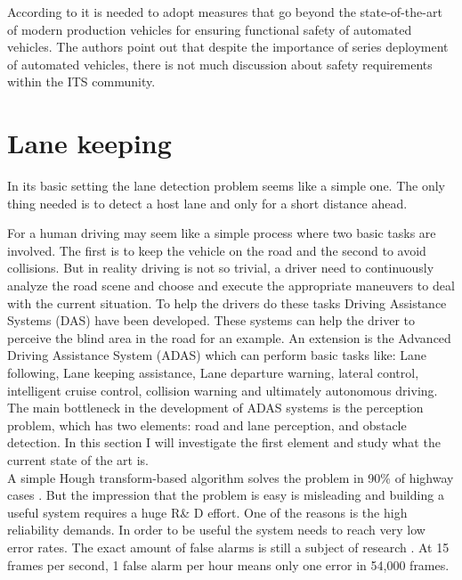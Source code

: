 According to \cite{stolte2016safety} it is needed to adopt measures that go beyond the state-of-the-art of modern production vehicles for ensuring functional safety of automated vehicles. The authors point out that despite the importance of series deployment of automated vehicles, there is not much discussion about safety requirements within the ITS community.  


\section{Lane keeping}
In its basic setting the lane detection problem seems like a simple one. The only thing needed is to detect a host lane and only for a short distance ahead.

For a human driving may seem like a simple process where two basic tasks are involved. The first is to keep the vehicle on the road and the second to avoid collisions. But in reality driving is not so trivial, a driver need to continuously analyze the road scene and choose and execute the appropriate maneuvers to deal with the current situation. To help the drivers do these tasks Driving Assistance Systems (DAS) have been developed. These systems can help the driver to perceive the blind area in the road for an example. An extension is the Advanced Driving Assistance System (ADAS) which can perform basic tasks like: Lane following, Lane keeping assistance, Lane departure warning, lateral control, intelligent cruise control, collision warning and ultimately autonomous driving.\\

The main bottleneck in the development of ADAS systems is the perception problem, which has two elements: road and lane perception, and obstacle detection. In this section I will investigate the first element and study what the current state of the art is.\\



A simple Hough transform-based algorithm solves the problem in 90\% of highway cases \cite{BarHillel2014}. 
But the impression that the problem is easy is misleading and building a useful system requires a huge R\& D effort. One of the reasons is the high reliability demands. In order to be useful the system needs to reach very low error rates. The exact amount of false alarms is still a subject of research \cite{BarHillel2014}.
At 15 frames per second, 1 false alarm per hour means only one error in 54,000 frames.\\


